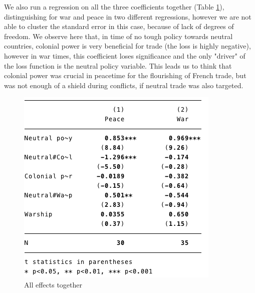 \documentclass[12pt,a4paper,notitlepage,english]{article}
\begin{document}
We also run a regression on all the three coefficients together (Table \ref{effects_together}), distinguishing for war and peace in two different regressions, however we are not able to cluster the standard error in this case, because of lack of degrees of freedom. We observe here that, in time of no tough policy towards neutral countries, colonial power is very beneficial for trade (the loss is highly negative), however in war times, this coefficient loses significance and the only "driver" of the loss function is the neutral policy variable. This leads us to think that colonial power was crucial in peacetime for the flourishing of French trade, but was not enough of a shield during conflicts, if neutral trade was also targeted. 
\begin{figure}
\centering
\caption{All effects together}
\label{effects_together}
\includegraphics[scale=.8]{reg4}
\end{figure}
\end{document}
